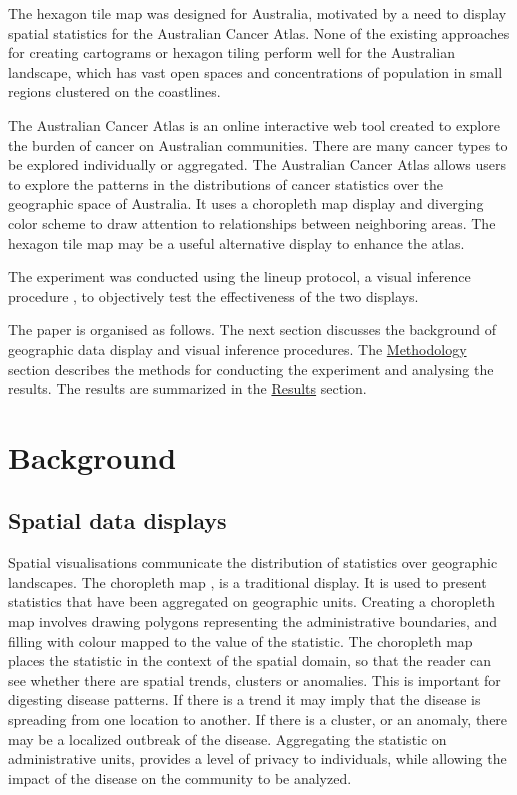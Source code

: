 \documentclass{monashthesis}
\begin{document}
The hexagon tile map was designed for Australia, motivated by a need to display spatial statistics for the Australian Cancer Atlas. None of the existing approaches for creating cartograms or hexagon tiling perform well for the Australian landscape, which has vast open spaces and concentrations of population in small regions clustered on the coastlines.

The Australian Cancer Atlas \autocite{TACA} is an online interactive web tool created to explore the burden of cancer on Australian communities. There are many cancer types to be explored individually or aggregated. The Australian Cancer Atlas allows users to explore the patterns in the distributions of cancer statistics over the geographic space of Australia. It uses a choropleth map display and diverging color scheme to draw attention to relationships between neighboring areas. The hexagon tile map may be a useful alternative display to enhance the atlas.

The experiment was conducted using the lineup protocol, a visual inference procedure \autocite{GIIV}, to objectively test the effectiveness of the two displays.

The paper is organised as follows. The next section discusses the background of geographic data display and visual inference procedures. The \protect\hyperlink{methodology}{Methodology} section describes the methods for conducting the experiment and analysing the results. The results are summarized in the \protect\hyperlink{results}{Results} section.

\hypertarget{background}{%
\section{Background}\label{background}}

\hypertarget{spatial-data-displays}{%
\subsection{Spatial data displays}\label{spatial-data-displays}}

Spatial visualisations communicate the distribution of statistics over geographic landscapes. The choropleth map \autocite{EI}, \autocite{BCM} is a traditional display. It is used to present statistics that have been aggregated on geographic units. Creating a choropleth map involves drawing polygons representing the administrative boundaries, and filling with colour mapped to the value of the statistic. The choropleth map places the statistic in the context of the spatial domain, so that the reader can see whether there are spatial trends, clusters or anomalies. This is important for digesting disease patterns. If there is a trend it may imply that the disease is spreading from one location to another. If there is a cluster, or an anomaly, there may be a localized outbreak of the disease. Aggregating the statistic on administrative units, provides a level of privacy to individuals, while allowing the impact of the disease on the community to be analyzed.
\end{document}

